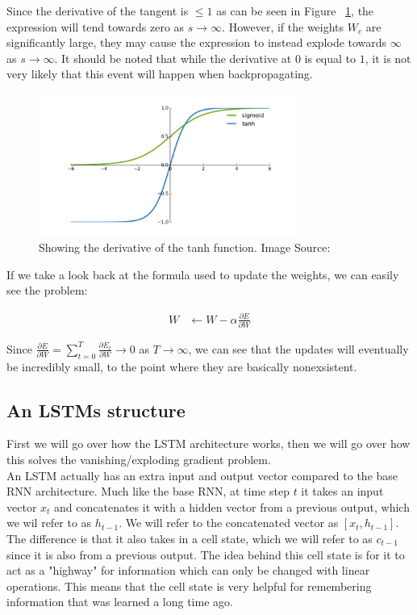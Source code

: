 \noindent
Since the derivative of the tangent is $\leq1$ as can be seen in Figure ~\ref{fig:tanh_deriv}, the expression will tend towards zero as $s \rightarrow \infty$. However, if the weights $W_c$ are significantly large, they may cause the expression to instead explode towards $\infty$ as $s \rightarrow \infty$. It should be noted that while the derivative at $0$ is equal to $1$, it is not very likely that this event will happen when backpropagating.\\

\begin{figure}[h]
    \centering
        \includegraphics[width=0.75\textwidth]{latex/imgs/tanh_deriv.png}
    \caption{Showing the derivative of the tanh function. Image Source:\cite{tanh}}
    \label{fig:tanh_deriv}
\end{figure}

\noindent
If we take a look back at the formula used to update the weights, we can easily see the problem:

\begin{align}
    W &\leftarrow W - \alpha \frac{\partial E}{\partial W}
\end{align}

\noindent
Since $\frac{\partial E}{\partial W} = \sum_{t=0}^{T} \frac{\partial E_t}{\partial W} \rightarrow 0$ as $T \rightarrow \infty$, we can see that the updates will eventually be incredibly small, to the point where they are basically nonexsistent.

\subsection{An LSTMs structure}
First we will go over how the LSTM architecture works, then we will go over how this solves the vanishing/exploding gradient problem.\\

\noindent
An LSTM actually has an extra input and output vector compared to the base RNN architecture. Much like the base RNN, at time step $t$ it takes an input vector $x_t$ and concatenates it with a hidden vector from a previous output, which we wil refer to as $h_{t-1}$. We will refer to the concatenated vector as $[x_t,h_{t-1}]$. The difference is that it also takes in a cell state, which we will refer to as $c_{t-1}$ since it is also from a previous output. The idea behind this cell state is for it to act as a "highway" for information which can only be changed with linear operations. This means that the cell state is very helpful for remembering information that was learned a long time ago.\\

